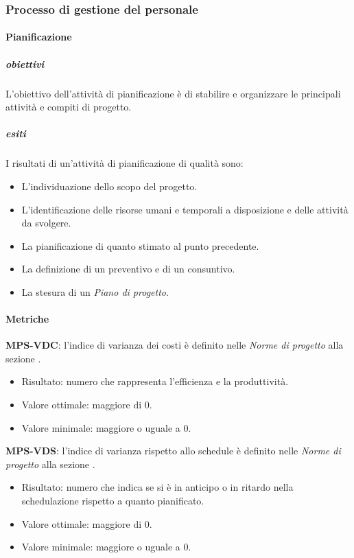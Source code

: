 \documentclass[../piano-di-qualifica.tex]{subfiles}
\begin{document}
\subsubsection{Processo di gestione del personale}%
\label{subs:processo_di_gestione_del_personale}

\paragraph{Pianificazione}%
\label{par:pianificazione}

\subparagraph{obiettivi}%
\label{subp:obiettivi}
L'obiettivo dell'attività di pianificazione è di stabilire e organizzare le principali attività e compiti di progetto.

\subparagraph{esiti}%
\label{subp:esiti}
I risultati di un'attività di pianificazione di qualità sono:
\begin{itemize}
  \item L'individuazione dello scopo del progetto.
  \item L'identificazione delle risorse umani e temporali a disposizione e delle attività da svolgere.
  \item La pianificazione di quanto stimato al punto precedente.
  \item La definizione di un preventivo e di un consuntivo.
  \item La stesura di un \textit{Piano di progetto}.
\end{itemize}

\paragraph{Metriche}%
\label{par:metriche}

\textbf{MPS-VDC}: l'indice di varianza dei costi è definito nelle \textit{Norme di progetto} alla sezione .
\begin{itemize}
  \item Risultato: numero che rappresenta l'efficienza e la produttività.
  \item Valore ottimale: maggiore di 0.
  \item Valore minimale: maggiore o uguale a 0.
\end{itemize}

\textbf{MPS-VDS}: l'indice di varianza rispetto allo schedule è definito nelle \textit{Norme di progetto} alla sezione .
\begin{itemize}
  \item Risultato: numero che indica se si è in anticipo o in ritardo nella schedulazione rispetto a quanto pianificato.
  \item Valore ottimale: maggiore di 0.
  \item Valore minimale: maggiore o uguale a 0.
\end{itemize}
\end{document}
